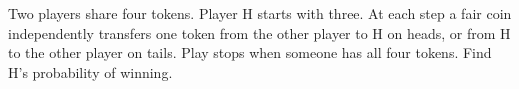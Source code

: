 Two players share four tokens. Player H starts with three. At each step a fair coin independently transfers one token from the other player to H on heads, or from H to the other player on tails. Play stops when someone has all four tokens. Find H's probability of winning.

